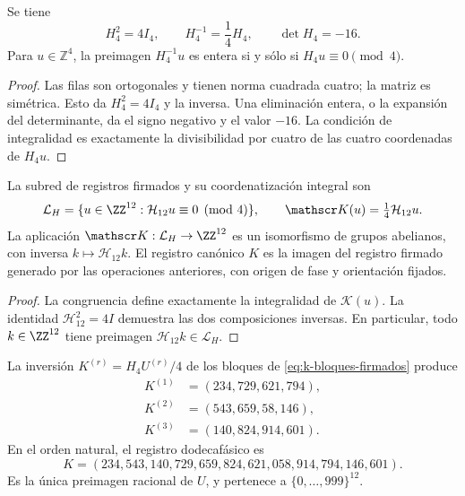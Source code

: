 \begin{lemma}
\label{lem:k-hadamard}
Se tiene
\[
 H_4^2=4I_4,\qquad H_4^{-1}=\frac14H_4,\qquad\det H_4=-16.
\]
Para \(u\in\mathbb Z^4\), la preimagen \(H_4^{-1}u\) es entera si y
sólo si \(H_4u\equiv0\pmod4\).
\end{lemma}

\begin{proof}
Las filas son ortogonales y tienen norma cuadrada cuatro; la matriz es
simétrica. Esto da \(H_4^2=4I_4\) y la inversa. Una eliminación entera,
o la expansión del determinante, da el signo negativo y el valor \(-16\).
La condición de integralidad es exactamente la divisibilidad por cuatro
de las cuatro coordenadas de \(H_4u\).
\end{proof}

\begin{definition}
La subred de registros firmados y su coordenatización integral son
\[
 \mathcal L_H=\{u\in\ZZ^{12}:\mathcal H_{12}u\equiv0\pmod4\},
 \qquad \mathscr K(u)=\tfrac14\mathcal H_{12}u.
\]
La aplicación \(\mathscr K:\mathcal L_H\to\ZZ^{12}\) es un isomorfismo
de grupos abelianos, con inversa \(k\mapsto\mathcal H_{12}k\).
El registro canónico \(K\) es la imagen del registro firmado generado
por las operaciones anteriores, con origen de fase y orientación fijados.
\end{definition}

\begin{proof}
La congruencia define exactamente la integralidad de \(\mathscr K(u)\).
La identidad \(\mathcal H_{12}^2=4I\) demuestra las dos composiciones
inversas. En particular, todo \(k\in\ZZ^{12}\) tiene preimagen
\(\mathcal H_{12}k\in\mathcal L_H\).
\end{proof}

\begin{proposition}
\label{prop:k-sello}
La inversión \(K^{(r)}=H_4U^{(r)}/4\) de los bloques de
\eqref{eq:k-bloques-firmados} produce
\begin{align*}
 K^{(1)}&=(234,729,621,794),\\
 K^{(2)}&=(543,659,58,146),\\
 K^{(3)}&=(140,824,914,601).
\end{align*}
En el orden natural, el registro dodecafásico es
\begin{equation}
 K=(234,543,140,729,659,824,621,058,914,794,146,601).
 \label{eq:k-vector}
\end{equation}
Es la única preimagen racional de \(U\), y pertenece a
\(\{0,\ldots,999\}^{12}\).
\end{proposition}

